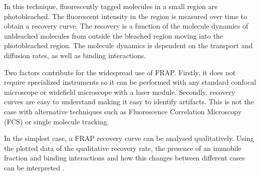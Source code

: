     In this technique, fluorescently tagged molecules in a small region
    are photobleached.  The fluorescent intensity in the region is
    measured over time to obtain a recovery curve.  The recovery is a
    function of the molecule dynamics of unbleached
    molecules from outside the bleached region moving into the
    photobleached region.  The molecule dynamics is dependent on the
    transport and diffusion rates, as well as binding interactions.

    Two factors contribute for the widespread use of FRAP.
    Firstly, it does not require specialized instruments
    so it can be performed with
    any standard confocal microscope or widefield microscope with a laser
    module.
    Secondly, recovery curves are easy to understand making it easy to
    identify artifacts.  This is not the case with alternative techniques
    such as Fluorescence Correlation Microscopy (FCS) or single molecule
    tracking.

    In the simplest case, a FRAP recovery curve can be analysed
    qualitatively.  Using the plotted data of the qualitative
    recovery rate, the presence of an immobile
    fraction and binding interactions and how this changes
    between different cases can be interpreted
    .

